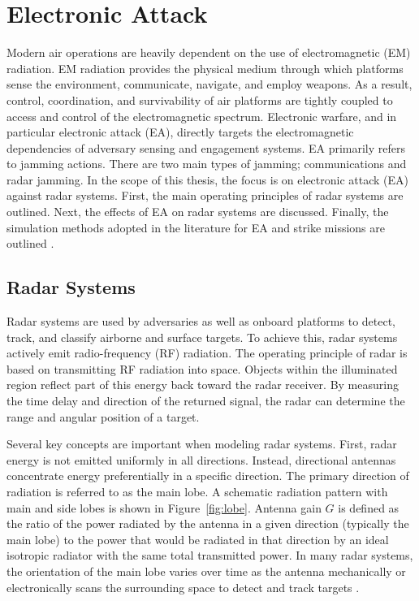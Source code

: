 \section{Electronic Attack}
Modern air operations are heavily dependent on the use of electromagnetic (EM) radiation. EM radiation provides the physical medium through which platforms sense the environment, communicate, navigate, and employ weapons. As a result, control, coordination, and survivability of air platforms are tightly coupled to access and control of the electromagnetic spectrum. 
Electronic warfare, and in particular electronic attack (EA), directly targets the electromagnetic dependencies of adversary sensing and engagement systems. EA primarily refers to jamming actions. There are two main types of jamming; communications and radar jamming. In the scope of this thesis, the focus is on electronic attack (EA) against radar systems. First, the main operating principles of radar systems are outlined. Next, the effects of EA on radar systems are discussed. Finally, the simulation methods adopted in the literature for EA and strike missions are outlined \cite{von_spreckelsen2018_ew_forgotten, AFDP3_85_2023}.

\subsection{Radar Systems}
Radar systems are used by adversaries as well as onboard platforms to detect, track, and classify airborne and surface targets. To achieve this, radar systems actively emit radio-frequency (RF) radiation. The operating principle of radar is based on transmitting RF radiation into space. Objects within the illuminated region reflect part of this energy back toward the radar receiver. By measuring the time delay and direction of the returned signal, the radar can determine the range and angular position of a target.

Several key concepts are important when modeling radar systems. First, radar energy is not emitted uniformly in all directions. Instead, directional antennas concentrate energy preferentially in a specific direction. The primary direction of radiation is referred to as the main lobe. A schematic radiation pattern with main and side lobes is shown in Figure~\ref{fig:lobe}. Antenna gain $G$ is defined as the ratio of the power radiated by the antenna in a given direction (typically the main lobe) to the power that would be radiated in that direction by an ideal isotropic radiator with the same total transmitted power. In many radar systems, the orientation of the main lobe varies over time as the antenna mechanically or electronically scans the surrounding space to detect and track targets \cite{AFDP3_85_2023, von_spreckelsen2018_ew_forgotten, skolnik_radar_2001, mitll_radar_course}.

